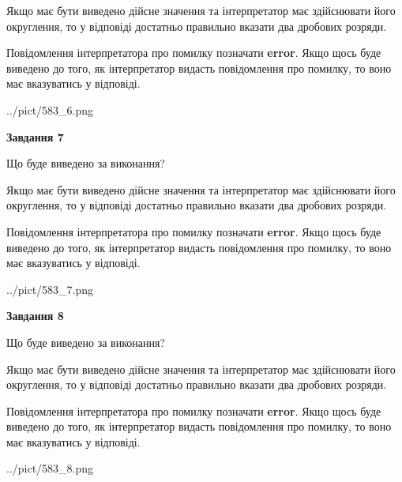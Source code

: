\documentclass[12pt, ukrainian]{article}
\begin{document}
{\begin {Large}
Якщо має бути виведено дійсне значення та інтерпретатор має здійснювати його округлення, 
то у відповіді достатньо правильно вказати два дробових розряди.

Повідомлення інтерпретатора про помилку позначати \textbf{error}.
Якщо щось буде виведено до того, як інтерпретатор видасть повідомлення про помилку, 
то воно має вказуватись у відповіді. \par

\begin{center}
	{../pict/583_6.png}
\end{center}
\newpage

{\begin {center}\textbf{Завдання 7}\end {center}}\par
Що буде виведено за виконання? \par

Якщо має бути виведено дійсне значення та інтерпретатор має здійснювати його округлення, 
то у відповіді достатньо правильно вказати два дробових розряди.

Повідомлення інтерпретатора про помилку позначати \textbf{error}.
Якщо щось буде виведено до того, як інтерпретатор видасть повідомлення про помилку, 
то воно має вказуватись у відповіді. \par

\begin{center}
	{../pict/583_7.png}
\end{center}
\newpage

{\begin {center}\textbf{Завдання 8}\end {center}}\par
Що буде виведено за виконання? \par

Якщо має бути виведено дійсне значення та інтерпретатор має здійснювати його округлення, 
то у відповіді достатньо правильно вказати два дробових розряди.

Повідомлення інтерпретатора про помилку позначати \textbf{error}.
Якщо щось буде виведено до того, як інтерпретатор видасть повідомлення про помилку, 
то воно має вказуватись у відповіді. \par

\begin{center}
	{../pict/583_8.png}
\end{center}
\newpage


\end{Large}}
\end{document}
